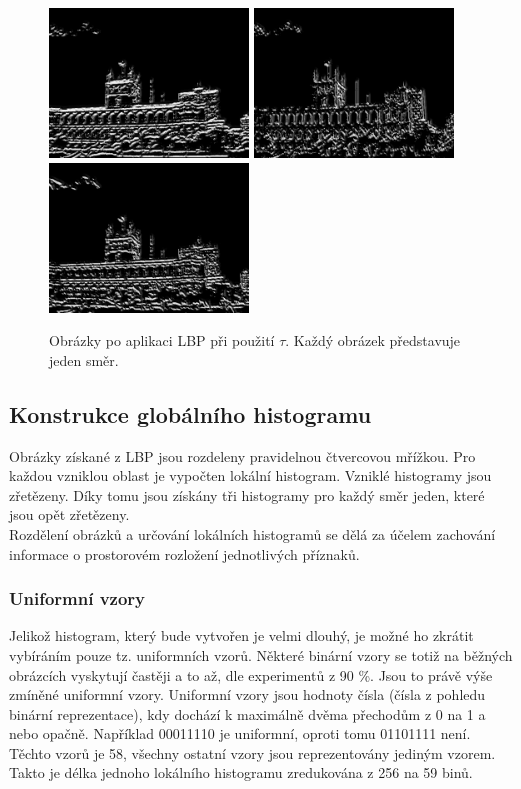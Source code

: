 \documentclass{report}
\begin{document}
\begin{figure}[H]
	\centering
	\includegraphics[width=150pt]{./img/lbp0_tau.jpg}
	\includegraphics[width=150pt]{./img/lbp1_tau.jpg}
	\includegraphics[width=150pt]{./img/lbp2_tau.jpg}
	\caption{Obrázky po aplikaci LBP při použití $\tau$. Každý obrázek představuje jeden směr.}
\end{figure} 

\subsection{Konstrukce globálního histogramu}
Obrázky získané z LBP jsou rozdeleny pravidelnou čtvercovou mřížkou. Pro každou vzniklou oblast je vypočten lokální histogram. Vzniklé histogramy jsou zřetězeny. Díky tomu jsou získány tři histogramy pro každý směr jeden, které jsou opět zřetězeny. \\
Rozdělení obrázků a určování lokálních histogramů se dělá za účelem zachování informace o prostorovém rozložení jednotlivých příznaků.

\subsubsection{Uniformní vzory}
Jelikož histogram, který bude vytvořen je velmi dlouhý, je možné ho zkrátit vybíráním pouze tz. uniformních vzorů. Některé binární vzory se totiž na běžných obrázcích vyskytují častěji a to až, dle experimentů z 90 \%. Jsou to právě výše zmíněné uniformní vzory. Uniformní vzory jsou hodnoty čísla (čísla z pohledu binární reprezentace), kdy dochází k maximálně dvěma přechodům z 0 na 1 a nebo opačně. Například 00011110 je uniformní, oproti tomu 01101111 není. Těchto vzorů je 58, všechny ostatní vzory jsou reprezentovány jediným vzorem. Takto je délka jednoho lokálního histogramu zredukována z 256 na 59 binů.
\end{document}
